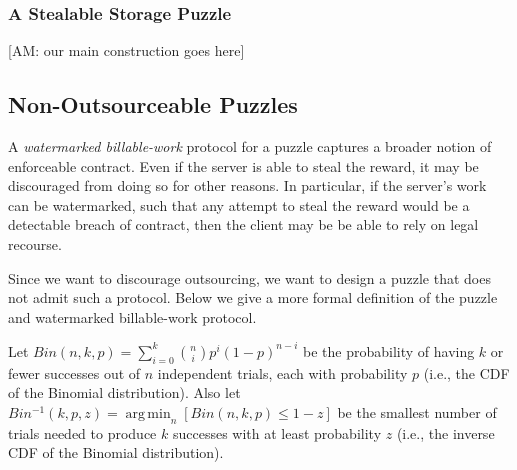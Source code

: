 \documentclass{article}
\newcommand{\anote}[1]{{\color{magenta}[AM: #1]}}
\theoremstyle{definition}
\theoremstyle{remark}
\DeclareMathOperator*{\ArgMin}{arg\,min}
\newcommand{\argmin}[1]{\displaystyle{\ArgMin_{#1}}}
\begin{document}
\subsubsection{A Stealable Storage Puzzle}

\anote{our main construction goes here}


\subsection{Non-Outsourceable Puzzles}

A {\em watermarked billable-work} protocol for a puzzle captures a broader notion of enforceable contract. Even if the server is able to steal the reward, it may be discouraged from doing so for other reasons. In particular, if the server's work can be watermarked, such that any attempt to steal the reward would be a detectable breach of contract, then the client may be be able to rely on legal recourse.

Since we want to discourage outsourcing, we want to design a puzzle that does not admit such a protocol. Below we give a more formal definition of the puzzle and watermarked billable-work protocol.

Let $Bin(n,k,p) = \sum^k_{i=0}{n \choose i}p^i(1-p)^{n-i}$ be the probability of having $k$ or fewer successes out of $n$ independent trials, each with probability $p$ (i.e., the CDF of the Binomial distribution). Also let $Bin^{-1}(k,p,z) = \argmin{n}\left[Bin(n,k,p) ≤ 1-z \right]$ be the smallest number of trials needed to produce $k$ successes with at least probability $z$ (i.e., the inverse CDF of the Binomial distribution).
\end{document}
